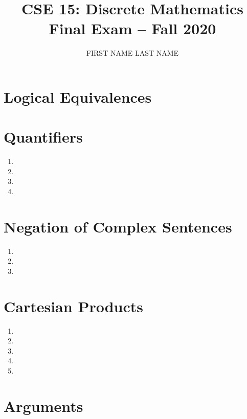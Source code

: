 \documentclass[11pt]{article}
\begin{document}
\title {CSE 15: Discrete Mathematics\\ Final Exam -- Fall 2020}
\author {FIRST NAME LAST NAME}
\date{}




\maketitle



\section{Logical Equivalences}


\section{Quantifiers}

\begin{enumerate}[label=\alph*)]
\item 
\item 
\item 
\item 
\end{enumerate}

\section{Negation of Complex Sentences}

\begin{enumerate}[label=\alph*)]
\item 
\item 
\item 
\end{enumerate}



\section{Cartesian Products}

\begin{enumerate}[label=\alph*)]
\item 
\item 
\item 
\item 
\item 
\end{enumerate}

\section{Arguments}
\end{document}
